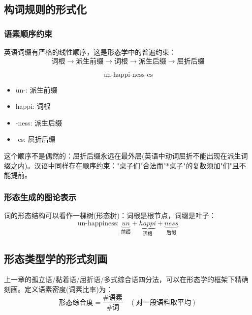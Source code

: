 \subsection{构词规则的形式化}

\subsubsection{语素顺序约束}

英语词缀有严格的线性顺序，这是形态学中的普遍约束：
\begin{equation}
    \text{词根} \rightarrow \text{派生前缀} \rightarrow \text{词根} \rightarrow \text{派生后缀} \rightarrow \text{屈折后缀}
\end{equation}

\begin{example}
\begin{equation}
    \text{un-happi-ness-es}
\end{equation}
\begin{itemize}
    \item un-: 派生前缀
    \item happi: 词根
    \item -ness: 派生后缀
    \item -es: 屈折后缀
\end{itemize}
这个顺序不是偶然的：屈折后缀永远在最外层(英语中动词屈折不能出现在派生词缀之内)。汉语中同样存在顺序约束："桌子们"合法而"*桌子"的复数须加"们"且不能提前。
\end{example}

\subsubsection{形态生成的图论表示}

词的形态结构可以看作一棵树(形态树)：词根是根节点，词缀是叶子：
\begin{equation}
    \text{un-happiness: } \underbrace{un}_{\text{前缀}} + \underbrace{happi}_{\text{词根}} + \underbrace{ness}_{\text{后缀}}
\end{equation}

\subsection{形态类型学的形式刻画}

上一章的孤立语/黏着语/屈折语/多式综合语四分法，可以在形态学的框架下精确刻画。定义语素密度(词素比率)为：
\begin{equation}
    \text{形态综合度} = \frac{\#\text{语素}}{\#\text{词}} \quad (\text{对一段语料取平均})
\end{equation}

